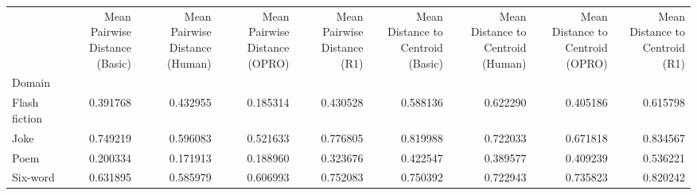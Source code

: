 \begin{tabular}{lrrrrrrrr}
\toprule
 & Mean Pairwise Distance (Basic) & Mean Pairwise Distance (Human) & Mean Pairwise Distance (OPRO) & Mean Pairwise Distance (R1) & Mean Distance to Centroid (Basic) & Mean Distance to Centroid (Human) & Mean Distance to Centroid (OPRO) & Mean Distance to Centroid (R1) \\
Domain &  &  &  &  &  &  &  &  \\
\midrule
Flash fiction & 0.391768 & 0.432955 & 0.185314 & 0.430528 & 0.588136 & 0.622290 & 0.405186 & 0.615798 \\
Joke & 0.749219 & 0.596083 & 0.521633 & 0.776805 & 0.819988 & 0.722033 & 0.671818 & 0.834567 \\
Poem & 0.200334 & 0.171913 & 0.188960 & 0.323676 & 0.422547 & 0.389577 & 0.409239 & 0.536221 \\
Six-word & 0.631895 & 0.585979 & 0.606993 & 0.752083 & 0.750392 & 0.722943 & 0.735823 & 0.820242 \\
\bottomrule
\end{tabular}
